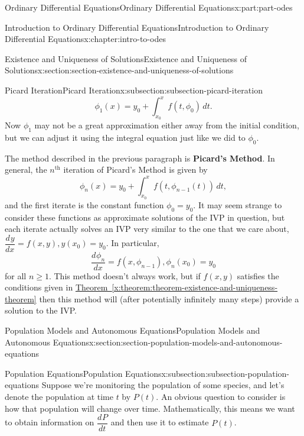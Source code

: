 \documentclass[twoside,10pt,]{book}
\newcommand{\xreffont}{\relax}
\newcommand{\terminology}[1]{\textbf{#1}}
\numberwithin{equation}{part}
\providecommand{\dv}[3][]{\dfrac{d^{#1} #2}{d #3^{#1}}}
\begin{document}
\begin{partptx}{Ordinary Differential Equations}{}{Ordinary Differential Equations}{}{}{x:part:part-odes}
\begin{chapterptx}{Introduction to Ordinary Differential Equations}{}{Introduction to Ordinary Differential Equations}{}{}{x:chapter:intro-to-odes}
\begin{sectionptx}{Existence and Uniqueness of Solutions}{}{Existence and Uniqueness of Solutions}{}{}{x:section:section-existence-and-uniqueness-of-solutions}
\begin{subsectionptx}{Picard Iteration}{}{Picard Iteration}{}{}{x:subsection:subsection-picard-iteration}
\begin{equation*}
\phi_{1}(x) = y_{0} + \int_{x_{0}}^{x}f(t,\phi_{0})\,dt.
\end{equation*}
Now \(\phi_{1}\) may not be a great approximation either away from the initial condition, but we can adjust it using the integral equation just like we did to \(\phi_{0}\).%
\par
The method described in the previous paragraph is \terminology{Picard's Method}. In general, the \(n^{\text{th}}\) iteration of Picard's Method is given by%
\begin{equation*}
\phi_{n}(x) = y_{0}+\int_{x_{0}}^{x}f(t,\phi_{n-1}(t))\,dt,
\end{equation*}
and the first iterate is the constant function \(\phi_{0} = y_{0}.\) It may seem strange to consider these functions as approximate solutions of the IVP in question, but each iterate actually solves an IVP very similar to the one that we care about, \(\dv{y}{x} = f(x,y), y(x_{0}) = y_{0}\). In particular,%
\begin{equation*}
\dv{\phi_{n}}{x} = f(x,\phi_{n-1}), \phi_{n}(x_{0}) = y_{0}
\end{equation*}
for all \(n\geq1\). This method doesn't always work, but if \(f(x,y)\) satisfies the conditions given in \hyperref[x:theorem:theorem-existence-and-uniqueness-theorem]{Theorem~{\xreffont\ref{x:theorem:theorem-existence-and-uniqueness-theorem}}} then this method will (after potentially infinitely many steps) provide a solution to the IVP.%
\end{subsectionptx}
\end{sectionptx}
%
%
\typeout{************************************************}
\typeout{************************************************}
%
\begin{sectionptx}{Population Models and Autonomous Equations}{}{Population Models and Autonomous Equations}{}{}{x:section:section-population-models-and-autonomous-equations}
%
%
\typeout{************************************************}
\typeout{************************************************}
%
\begin{subsectionptx}{Population Equations}{}{Population Equations}{}{}{x:subsection:subsection-population-equations}
Suppose we're monitoring the population of some species, and let's denote the population at time \(t\) by \(P(t)\). An obvious question to consider is how that population will change over time. Mathematically, this means we want to obtain information on \(\dv{P}{t}\) and then use it to estimate \(P(t)\).%

\end{subsectionptx}
\end{sectionptx}
\end{chapterptx}
\end{partptx}
\end{document}
